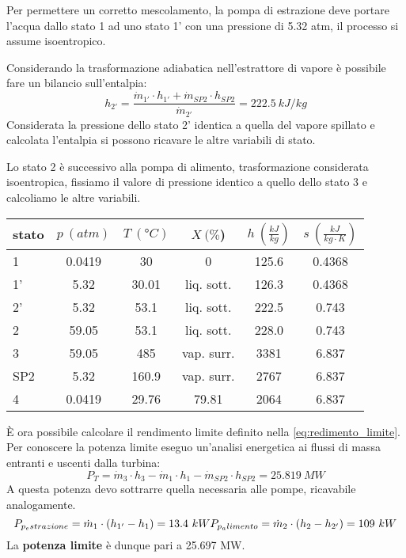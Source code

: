Per permettere un corretto mescolamento, la pompa di estrazione deve portare l'acqua dallo stato 1 ad uno stato 1' con una pressione di 5.32 atm, il processo si assume
isoentropico.

Considerando la trasformazione adiabatica nell'estrattore di vapore è possibile fare un bilancio sull'entalpia:
\begin{equation*}
    h_{2'} = \frac{\dot m_{1'}\cdot h_{1'} + \dot m_{SP2} \cdot h_{SP2}}{\dot m_{2'}} = 222.5\ kJ/kg
\end{equation*}
Considerata la pressione dello stato 2' identica a quella del vapore spillato e calcolata l'entalpia si possono ricavare le altre variabili di stato.

Lo stato 2 è successivo alla pompa di alimento, trasformazione considerata isoentropica, fissiamo il valore di pressione identico a quello dello stato 3 e calcoliamo
le altre variabili.
\begin{center}
    \begin{tabular}{l|c|c|c|c|c}
        stato    & $p\ (atm)$ & $T\ (\text{°}C) $&$X\ (\%$)& $h\ (\frac{kJ}{kg})$  & $s\ (\frac{kJ}{kg\cdot K})$\\ \hline
        1   &        0.0419 &            30   &    0      & 125.6    &0.4368 \\ \hline     %
        1'  &        5.32    &           30.01   &liq. sott.  & 126.3&0.4368 \\ \hline      %
        2'   &       5.32    &           53.1&liq. sott.& 222.5    &0.743 \\ \hline         %
        2   &        59.05   &           53.1&liq. sott.&  228.0   &0.743   \\ \hline       %
        3   &        59.05   &           485  & vap. surr.& 3381     &6.837  \\ \hline  %
        SP2  &       5.32        &       160.9 &  vap. surr.&2767     &6.837  \\ \hline  %
        4   &        0.0419       &      29.76&     79.81 & 2064     &6.837                 %
    \end{tabular}
\end{center}

È ora possibile calcolare il rendimento limite definito nella \eqref{eq:redimento_limite}. Per conoscere la potenza limite eseguo un'analisi energetica
ai flussi di massa entranti e uscenti dalla turbina:
\begin{equation*}
    P_T = \dot m_3 \cdot h_3 - \dot m_1 \cdot h_1 - \dot m_{SP2} \cdot h_{SP2} = 25.819\ MW
\end{equation*}
A questa potenza devo sottrarre quella necessaria alle pompe, ricavabile analogamente.
\begin{equation*}
    P_{p_estrazione} = \dot m_1 \cdot \left( h_{1'} - h_1 \right) = 13.4\ kW \\
    P_{p_alimento} = \dot m_2 \cdot \left( h_2 - h_{2'} \right) = 109\ kW 
\end{equation*}
La \textbf{potenza limite} è dunque pari a 25.697 MW.

